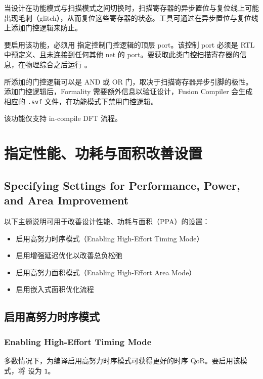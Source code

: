 当设计在功能模式与扫描模式之间切换时，扫描寄存器的异步置位与复位线上可能出现毛刺（glitch），从而复位这些寄存器的状态。工具可通过在异步置位与复位线上添加门控逻辑来防止。

要启用该功能，必须用  指定控制门控逻辑的顶层 port。该控制 port 必须是 RTL 中预定义、且未连接到任何其他 net 的 port。要获取此类门控扫描寄存器的信息，在物理综合之后运行 。

所添加的门控逻辑可以是 AND 或 OR 门，取决于扫描寄存器异步引脚的极性。添加门控逻辑后，Formality 需要额外信息以验证设计，Fusion Compiler 会生成相应的 \texttt{.svf} 文件，在功能模式下禁用门控逻辑。

\begin{noteBox}
该功能仅支持 in-compile DFT 流程。
\end{noteBox}

\section{指定性能、功耗与面积改善设置}
\subsection*{Specifying Settings for Performance, Power, and Area Improvement}

以下主题说明可用于改善设计性能、功耗与面积（PPA）的设置：
\begin{itemize}
  \item 启用高努力时序模式（Enabling High-Effort Timing Mode）
  \item 启用增强延迟优化以改善总负松弛
  \item 启用高努力面积模式（Enabling High-Effort Area Mode）
  \item 启用嵌入式面积优化流程
\end{itemize}

\subsection{启用高努力时序模式}
\subsubsection*{Enabling High-Effort Timing Mode}

多数情况下，为编译启用高努力时序模式可获得更好的时序 QoR。要启用该模式，将  设为 \texttt{1}。

